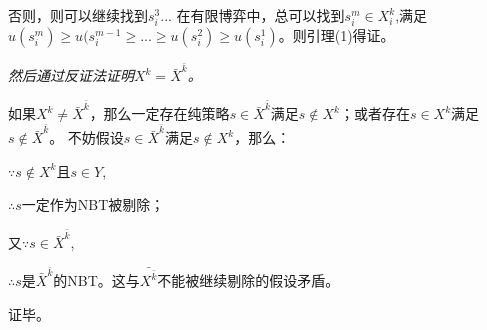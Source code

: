 \documentclass[10pt,fleqn]{article}
\begin{document}
否则，则可以继续找到$s^3_i $... 在有限博弈中，总可以找到$s^m_i \in X_i^k$,满足$u(s^m_i) \geq u(s^{m-1}_i \geq ... \geq u(s^2_i) \geq u(s^1_i) $。则引理(1)得证。

\emph{然后通过反证法证明$X^k = \bar{X}^{\bar{k}} $。}

如果$X^k \neq \bar{X}^{\bar{k}} $，那么一定存在纯策略$s \in \bar{X}^{\bar{k}} $满足$s \notin X^k $；或者存在$s \in X^k $满足$s \notin \bar{X}^{\bar{k}} $。 不妨假设$s \in \bar{X}^{\bar{k}} $满足$s \notin X^k $，那么：

$\because s \notin X^k $且$s \in Y$,

$\therefore s $一定作为NBT被剔除；

又$\because s \in \bar{X}^{\bar{k}}$,

$\therefore s$是$\bar{X}^{\bar{k}}$的NBT。这与$\bar{X^{\bar{k}}}$不能被继续剔除的假设矛盾。

证毕。
\end{document}
